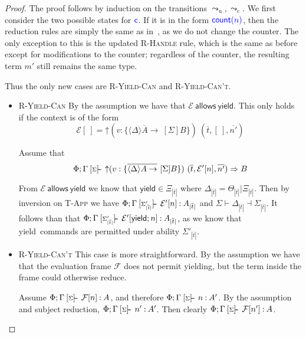 \documentclass[msc,deptreport,cs]{infthesis} %
\newcommand{\counter}{{\color{blue} \textsf{c}}}
\newcommand{\justc}[1]{{\color{blue} \textsf{count}({#1})}}
\newcommand\yield{\textsf{yield}\xspace}
\newcommand\allows{\textsf{allows}\xspace}
\newcommand\Cse{\textbf{Case}}
\newcommand{\many}{\overline}
\newcommand{\sigentails}[1]{\mathbin{[{\text{\scriptsize ${#1}$}}]\hspace{-0.4ex}\text{-\!-}}\,}
\newcommand{\inferbase}[5]{#1; #3 \mathbin{#2} {#4} \Rightarrow {#5}}
\newcommand{\checkbase}[5]{#1; #3 \mathbin{#2} #5 \mathbin{:} #4}
\newcommand{\makes}[5]{\inferbase{#1}{\sigentails{#3}}{#2}{#4}{#5}}
\newcommand{\has}[5]{\checkbase{#1}{\sigentails{#3}}{#2}{#4}{#5}}
\newcommand{\checksk}{\has{\kenv}}
\newcommand{\inferskgs}{\makes{\kenv}{\Gamma}{\sigs}}
\newcommand{\checkskgs}{\has{\kenv}{\Gamma}{\sigs}}
\newcommand{\adj}{\Delta}
\newcommand{\adapt}{\Theta}
\newcommand{\ext}{\Xi}
\newcommand{\sigs}{\Sigma}
\newcommand{\thunk}[1]{\{{#1}\}}
\newcommand{\effin}[1]{\langle {#1} \rangle}
\newcommand{\effout}[1]{[{#1}]}
\newcommand{\EC}{\mathcal{E}}
\newcommand{\EF}{\mathcal{F}}
\newcommand{\cu}{\mathord{\uparrow}}
\newcommand{\redtou}{\leadsto_{\mathrm{u}}}
\newcommand{\redtoc}{\leadsto_{\mathrm{c}}}
\newcommand{\kenv}{\Phi}  %
\newcommand{\adjact}[3]{{#1}\vdash{#2}\dashv{#3}}
\newcommand{\pipe}{\texttt{|}}
\begin{document}
\begin{proof}
The proof follows by induction on the transitions $\redtou, \redtoc$. We first
consider the two possible states for $\counter$. If it is in the form
$\justc{n}$, then the reduction rules are simply the same as
in~\cite{convent2020doo}, as we do not change the counter. The only exception to
this is the updated \textsc{R-Handle} rule, which is the same as before except
for modifications to the counter; regardless of the counter, the resulting term
$m'$ still remains the same type.

Thus the only new cases are \textsc{R-Yield-Can} and \textsc{R-Yield-Can't}.

\begin{itemize}
\item[\Cse] \textsc{R-Yield-Can}
  By the assumption we have that $\EC~\allows~\yield$. This only holds
  if the context is of the form
  \[\EC[~] = \cu (v : \thunk{\many{\effin{\adj} A
      \to}~\effout{\sigs}B})~(\many{t},[~],\many{n'})\]

  Assume that
  \[\inferskgs{\cu (v : \thunk{\many{\effin{\adj} A
      \to}~\effout{\sigs}B})~(\many{t},\EC'[n],\many{n'})}{B}\]

  From $\EC~\allows~\yield$ we know that $\yield \in \ext_{|\many{t}|}$ where
  $\adj_{|\many{t}|} = \adapt_{|\many{t}|}\pipe\ext_{|\many{t}|}$.
  Then by inversion on \textsc{T-App} we have
  $\checksk{\Gamma}{\sigs'_{|\many{t}|}}{A_{|\many{t}|}}{\EC'[n]}$ and
  $\adjact{\sigs}{\adj_{|\many{t}|}}{\sigs_{|\many{t}|}}$.
  It follows than that
  $\checksk{\Gamma}{\sigs'_{|\many{t}|}}{A_{|\many{t}|}}{\EC'[\yield; n]}$, as
  we know that \yield~commands are permitted under ability $\sigs'_{|\many{t}|}$.


\item[\Cse] \textsc{R-Yield-Can't}
  This case is more straightforward. By the assumption we have that the
  evaluation frame $\EF$ does not permit yielding, but the term inside the frame
  could otherwise reduce.

  Assume $\checkskgs{A}{\EF[n]}$, and therefore $\checkskgs{A'}{n}$. By the
  assumption and subject reduction, $\checkskgs{A'}{n'}$. Then clearly
  $\checkskgs{A}{\EF[n']}$.

\end{itemize}
\end{proof}
\end{document}
